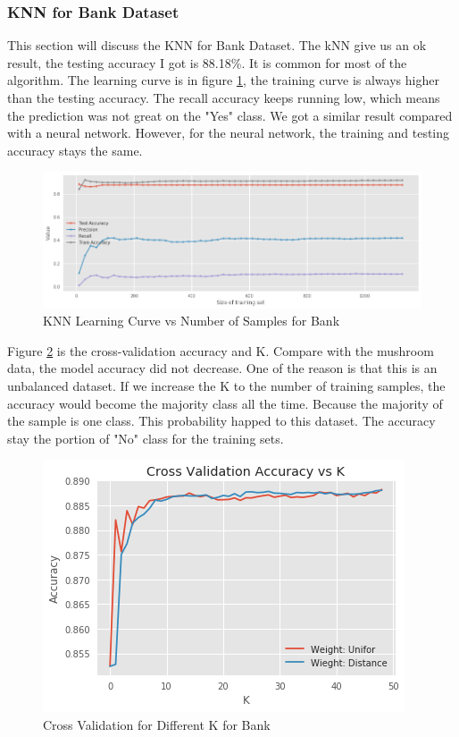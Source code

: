 \documentclass[10pt, conference, compsocconf]{IEEEtran}
\begin{document}
\subsubsection{KNN for Bank Dataset}

This section will discuss the KNN for Bank Dataset. The kNN give us an ok result, the testing accuracy I got is 88.18\%. It is common for most of the algorithm. The learning curve is in figure \ref{fig:bank_knn_learning}, the training curve is always higher than the testing accuracy. The recall accuracy keeps running low, which means the prediction was not great on the "Yes" class. We got a similar result compared with a neural network. However, for the neural network, the training and testing accuracy stays the same.

\begin{figure}[h]
	\centering
	\includegraphics[scale = 0.25]{image/bank_knn_learning.png}
	\caption{KNN Learning Curve vs Number of Samples for Bank}
	\label{fig:bank_knn_learning}
\end{figure}

Figure \ref{fig:bank_knn_K} is the cross-validation accuracy and K. Compare with the mushroom data, the model accuracy did not decrease. One of the reason is that this is an unbalanced dataset. If we increase the K to the number of training samples, the accuracy would become the majority class all the time. Because the majority of the sample is one class. This probability happed to this dataset. The accuracy stay the portion of "No" class for the training sets.

\begin{figure}[h]
	\centering
	\includegraphics[scale = 0.5]{image/bank_knn_learning_k.png}
	\caption{Cross Validation for Different K for Bank}
	\label{fig:bank_knn_K}
\end{figure}
\end{document}
